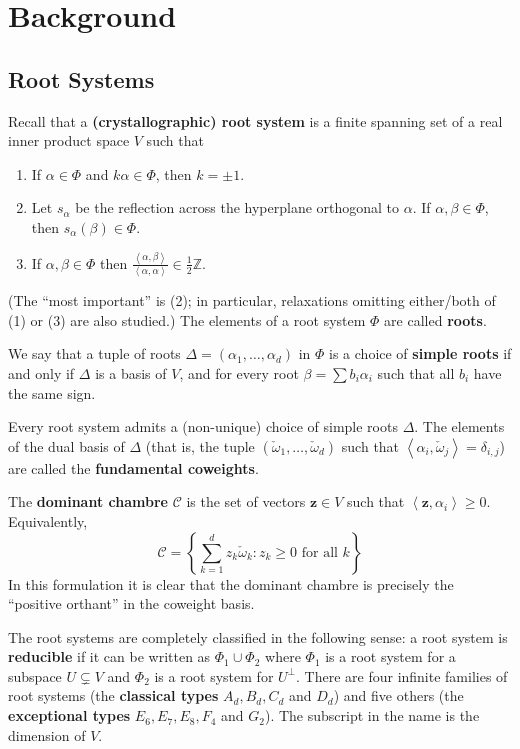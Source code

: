 \documentclass[A4,12pt]{article}
\newcommand{\<}{\left\langle}
\renewcommand{\>}{\right\rangle}
\newcommand{\coweight}{\check{\omega}}
\newcommand{\z}{\mathbf{z}}
\theoremstyle{definition}
\theoremstyle{example}
\begin{document}
\section{Background}

\subsection{Root Systems}

Recall that a \textbf{(crystallographic) root system} is a finite spanning set of a real inner product space $V$ such that
\begin{enumerate}[(1)]
\item If $\alpha\in \Phi$ and $k\alpha\in\Phi$, then $k=\pm 1$. 
\item Let $s_\alpha$ be the reflection across the hyperplane orthogonal to $\alpha$. If $\alpha,\beta\in\Phi$, then $s_\alpha(\beta)\in\Phi$.
\item If $\alpha,\beta\in\Phi$ then $\frac{\<\alpha,\beta\>}{\<\alpha,\alpha\>}\in \frac12\mathbb{Z}$.
\end{enumerate}
(The ``most important'' is (2); in particular, relaxations omitting either/both of (1) or (3) are also studied.) The elements of a root system $\Phi$ are called \textbf{roots}. 

We say that a tuple of roots $\Delta=(\alpha_1,\dots,\alpha_d)$ in $\Phi$ is a choice of \textbf{simple roots} if and only if $\Delta$ is a basis of $V$, and for every root $\beta=\sum b_i\alpha_i$ such that all $b_i$ have the same sign. 

Every root system admits a (non-unique) choice of simple roots $\Delta$. The elements of the dual basis of $\Delta$ (that is, the tuple $(\coweight_1,\dots,\coweight_d)$ such that $\<\alpha_i,\coweight_j\>=\delta_{i,j}$) are called the \textbf{fundamental coweights}.

The \textbf{dominant chambre} $\mathcal{C}$ is the set of vectors $\z\in V$ such that $\<\z,\alpha_i\>\geq 0$. Equivalently,
\[
\mathcal{C} = \left\{\sum_{k=1}^d z_k\coweight_k: z_k\geq 0 \text{ for all } k\right\}
\]
In this formulation it is clear that the dominant chambre is precisely the ``positive orthant'' in the coweight basis.

The root systems are completely classified in the following sense: a root system is \textbf{reducible} if it can be written as $\Phi_1\cup \Phi_2$ where $\Phi_1$ is a root system for a subspace $U\subsetneq V$ and $\Phi_2$ is a root system for $U^\perp$. There are four infinite families of root systems (the \textbf{classical types} $A_d, B_d, C_d$ and $D_d$) and five others (the \textbf{exceptional types} $E_6, E_7, E_8, F_4$ and $G_2$). The subscript in the name is the dimension of $V$.
\end{document}
